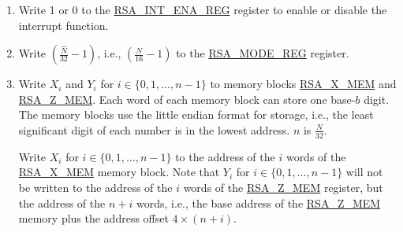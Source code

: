 \documentclass[main\_\_EN.tex]{subfiles}
\begin{document}
\begin{enumerate}

    \item Write 1 or 0 to the \hyperref[regdesc:RSAINTENAREG]{RSA\_INT\_ENA\_REG} register to enable or disable the interrupt function.

    \item Write \begin{math}( \frac{\hat{N}}{32} - 1 )\end{math}, i.e., \begin{math}( \frac{N}{16} - 1 )\end{math} to the \hyperref[regdesc:RSAMODEREG]{RSA\_MODE\_REG} register.

    \item Write \begin{math}{X}_{i}\end{math} and \begin{math}{Y}_{i}\end{math} for \begin{math}i \in \{ 0, 1, \dots, n-1 \} \end{math} to memory blocks \hyperref[regdesc:RSAmemory]{RSA\_X\_MEM} and \hyperref[regdesc:RSAmemory]{RSA\_Z\_MEM}. Each word of each memory block can store one base-\begin{math}b\end{math} digit. The memory blocks use the little endian format for storage, i.e., the least significant digit of each number is in the lowest address. \begin{math}n\end{math} is \begin{math} \frac{N}{32} \end{math}.

         Write \begin{math}{X}_{i}\end{math} for \begin{math}i \in \{ 0, 1, \dots, n-1 \} \end{math} to the address of the \begin{math}i\end{math} words of the \hyperref[regdesc:RSAmemory]{RSA\_X\_MEM} memory block. Note that \begin{math}{Y}_{i}\end{math} for \begin{math}i \in \{ 0, 1, \dots, n-1 \} \end{math} will not be written to the address of the \begin{math}i\end{math} words of the \hyperref[regdesc:RSAmemory]{RSA\_Z\_MEM} register, but the address of the \begin{math}n+i\end{math} words, i.e., the base address of the \hyperref[regdesc:RSAmemory]{RSA\_Z\_MEM} memory plus the address offset \begin{math}4 \times (n+i) \end{math}.


\end{enumerate}
\end{document}
